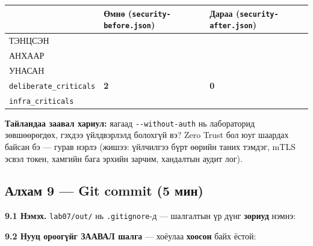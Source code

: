 \begingroup\scriptsize\begin{longtable}[]{@{}lll@{}}
\toprule
& Өмнө (\texttt{security-before.\allowbreak{}json}) & Дараа (\texttt{security-after.\allowbreak{}json})\tabularnewline
\midrule
\endhead
ТЭНЦСЭН & &\tabularnewline
АНХААР & &\tabularnewline
УНАСАН & &\tabularnewline
\texttt{deliberate\_\allowbreak{}criticals} & \textbf{2} & \textbf{0}\tabularnewline
\texttt{infra\_criticals} & &\tabularnewline
\bottomrule
\end{longtable}\endgroup

\textbf{Тайландаа заавал хариул:} яагаад \texttt{-\/-without-auth} нь лабораторид зөвшөөрөгдөх, гэхдээ үйлдвэрлэлд болохгүй вэ? Zero Trust бол юуг шаардах байсан бэ --- гурав нэрлэ (жишээ: үйлчилгээ бүрт өөрийн таних тэмдэг, mTLS эсвэл токен, хамгийн бага эрхийн зарчим, хандалтын аудит лог).

\hypertarget{ux430ux43bux445ux430ux43c-9-git-commit-5-ux43cux438ux43d}{%
\subsection{Алхам 9 --- Git commit (5 мин)}\label{ux430ux43bux445ux430ux43c-9-git-commit-5-ux43cux438ux43d}}

\textbf{9.1 Нэмэх.} \texttt{lab07/out/} нь \texttt{.gitignore}-д --- шалгалтын үр дүнг \textbf{зориуд} нэмнэ:

\begin{Shaded}
\begin{Highlighting}[]
\end{Highlighting}
\end{Shaded}

\textbf{9.2 Нууц ороогүйг ЗААВАЛ шалга} --- хоёулаа \textbf{хоосон} байх ёстой:

\begin{Shaded}
\begin{Highlighting}[]
\KeywordTok{|} 
\end{Highlighting}
\end{Shaded}

